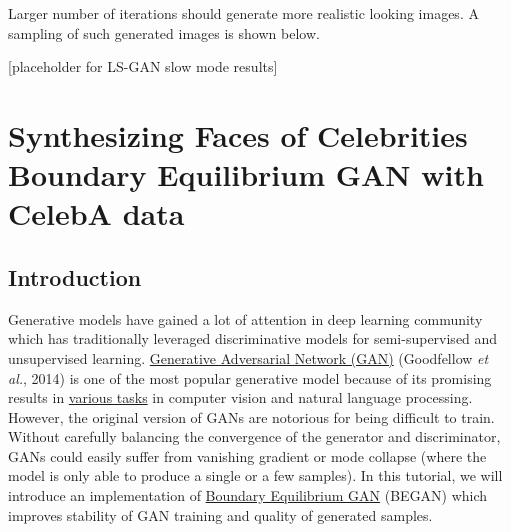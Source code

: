 \documentclass[]{book}
\newenvironment{Shaded}{\begin{snugshade}}{\end{snugshade}}
\newcommand{\DecValTok}[1]{\textcolor[rgb]{0.00,0.00,0.81}{#1}}
\newcommand{\ImportTok}[1]{#1}
\newcommand{\CommentTok}[1]{\textcolor[rgb]{0.56,0.35,0.01}{\textit{#1}}}
\newcommand{\OperatorTok}[1]{\textcolor[rgb]{0.81,0.36,0.00}{\textbf{#1}}}
\newcommand{\NormalTok}[1]{#1}
\theoremstyle{definition}
\theoremstyle{definition}
\theoremstyle{definition}
\theoremstyle{remark}
\begin{document}
Larger number of iterations should generate more realistic looking
images. A sampling of such generated images is shown below.

{[}placeholder for LS-GAN slow mode results{]}

\begin{Shaded}
\begin{Highlighting}[]

\end{Highlighting}
\end{Shaded}

\chapter{Synthesizing Faces of Celebrities Boundary Equilibrium GAN with
CelebA
data}\label{synthesizing-faces-of-celebrities-boundary-equilibrium-gan-with-celeba-data}

\section{Introduction}\label{introduction-1}

Generative models have gained a lot of attention in deep learning
community which has traditionally leveraged discriminative models for
semi-supervised and unsupervised learning.
\href{https://arxiv.org/pdf/1406.2661v1.pdf}{Generative Adversarial
Network (GAN)} (Goodfellow \emph{et al.}, 2014) is one of the most
popular generative model because of its promising results in
\href{https://github.com/HKCaesar/really-awesome-gan}{various tasks} in
computer vision and natural language processing. However, the original
version of GANs are notorious for being difficult to train. Without
carefully balancing the convergence of the generator and discriminator,
GANs could easily suffer from vanishing gradient or mode collapse (where
the model is only able to produce a single or a few samples). In this
tutorial, we will introduce an implementation of
\href{https://arxiv.org/pdf/1703.10717.pdf}{Boundary Equilibrium GAN}
(BEGAN) which improves stability of GAN training and quality of
generated samples.

\begin{Shaded}
\end{Shaded}
\end{document}
